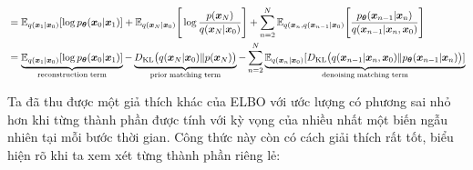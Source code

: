 \documentclass[14pt, a4paper]{article}
\numberwithin{equation}{section}
\numberwithin{figure}{section}
\numberwithin{dl}{section}
\numberwithin{md}{section}
\numberwithin{bd}{section}
\numberwithin{dn}{section}
\numberwithin{hq}{section}
\begin{document}
\begin{equation*}
\begin{aligned}
            &= \mathbb{E}_{q(\boldsymbol{x}_1 \vert \boldsymbol{x}_0)} \lbrack \log p_{\boldsymbol{\theta}} (\boldsymbol{x}_0 \vert \boldsymbol{x}_1) \rbrack + \mathbb{E}_{q(\boldsymbol{x}_N \vert \boldsymbol{x}_0)} \Bigg \lbrack \log \dfrac{p(\boldsymbol{x}_N)}{q(\boldsymbol{x}_N \vert \boldsymbol{x}_0)} \Bigg \rbrack + \sum_{n=2}^N \mathbb{E}_{q(\boldsymbol{x}_n, q(\boldsymbol{x}_{n-1} \vert \boldsymbol{x}_0)} \Bigg \lbrack \dfrac{p_{\boldsymbol{\theta}} (\boldsymbol{x}_{n-1} \vert \boldsymbol{x}_n)}{q(\boldsymbol{x}_{n-1} \vert \boldsymbol{x}_n, \boldsymbol{x}_0)} \Bigg \rbrack \\
            &= \underbrace{\mathbb{E}_{q(\boldsymbol{x}_1 \vert \boldsymbol{x}_0)} \lbrack \log p_{\boldsymbol{\theta}} (\boldsymbol{x}_0 \vert \boldsymbol{x}_1) \rbrack}_{\mathrm{reconstruction \thickspace term}} - \underbrace{D_{\mathrm{KL}} \big( q(\boldsymbol{x}_N \vert \boldsymbol{x}_0) \Vert p(\boldsymbol{x}_N) \big)}_{\mathrm{prior \thickspace matching \thickspace term}} - \sum_{n=2}^N \underbrace{\mathbb{E}_{q(\boldsymbol{x}_n \vert \boldsymbol{x}_0)} \lbrack D_{\mathrm{KL}} \big( q(\boldsymbol{x}_{n-1} \vert \boldsymbol{x}_n, \boldsymbol{x}_0) \Vert p_{\boldsymbol{\theta}} (\boldsymbol{x}_{n-1} \vert \boldsymbol{x}_n) \big) \rbrack}_{\mathrm{denoising \thickspace matching \thickspace term}}
        \end{aligned}
    \end{equation*}

    Ta đã thu được một giả thích khác của ELBO với ước lượng có phương sai nhỏ hơn khi từng thành phần được tính với kỳ vọng của nhiều nhất một biến ngẫu nhiên tại mỗi bước thời gian.
    Công thức này còn có cách giải thích rất tốt, biểu hiện rõ khi ta xem xét từng thành phần riêng lẻ:
\end{document}
